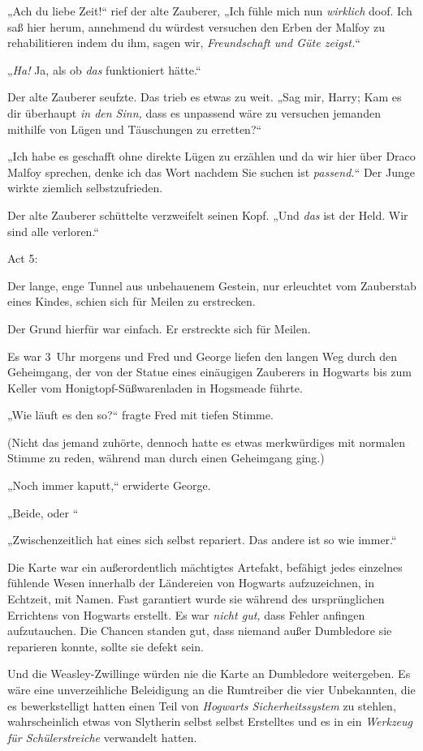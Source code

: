 {„Ach du liebe Zeit!“ rief der alte Zauberer, „Ich fühle mich nun \emph{wirklich} doof. Ich saß hier herum, annehmend du würdest versuchen den Erben der Malfoy zu rehabilitieren indem du ihm, sagen wir, \emph{Freundschaft und Güte zeigst.}“

„\emph{Ha!} Ja, als ob \emph{das} funktioniert hätte.“

Der alte Zauberer seufzte. Das trieb es etwas zu weit. „Sag mir, Harry; Kam es dir überhaupt \emph{in den Sinn,} dass es unpassend wäre zu versuchen jemanden mithilfe von Lügen und Täuschungen zu erretten?“

„Ich habe es geschafft ohne direkte Lügen zu erzählen und da wir hier über Draco Malfoy sprechen, denke ich das Wort nachdem Sie suchen ist \emph{passend.}“ Der Junge wirkte ziemlich selbstzufrieden.

Der alte Zauberer schüttelte verzweifelt seinen Kopf. „Und \emph{das} ist der Held. Wir sind alle verloren.“

Act 5:

Der lange, enge Tunnel aus unbehauenem Gestein, nur erleuchtet vom Zauberstab eines Kindes, schien sich für Meilen zu erstrecken.

Der Grund hierfür war einfach. Er erstreckte sich für Meilen.

Es war 3~Uhr morgens und Fred und George liefen den langen Weg durch den Geheimgang, der von der Statue eines einäugigen Zauberers in Hogwarts bis zum Keller vom Honigtopf-Süßwarenladen in Hogsmeade führte.

„Wie läuft es den so?“ fragte Fred mit tiefen Stimme.

(Nicht das jemand zuhörte, dennoch hatte es etwas merkwürdiges mit normalen Stimme zu reden, während man durch einen Geheimgang ging.)

„Noch immer kaputt,“ erwiderte George.

„Beide, oder \later“

„Zwischenzeitlich hat eines sich selbst repariert. Das andere ist so wie immer.“

Die Karte war ein außerordentlich mächtigtes Artefakt, befähigt jedes einzelnes fühlende Wesen innerhalb der Ländereien von Hogwarts aufzuzeichnen, in Echtzeit, mit Namen. Fast garantiert wurde sie während des ursprünglichen Errichtens von Hogwarts erstellt. Es war \emph{nicht gut,} dass Fehler anfingen aufzutauchen. Die Chancen standen gut, dass niemand außer Dumbledore sie reparieren konnte, sollte sie defekt sein.

Und die Weasley-Zwillinge würden nie die Karte an Dumbledore weitergeben. Es wäre eine unverzeihliche Beleidigung an die Rumtreiber \later die vier Unbekannten, die es bewerkstelligt hatten einen Teil von \emph{Hogwarts Sicherheitssystem} zu stehlen, wahrscheinlich etwas von Slytherin selbst selbst Erstelltes und es in ein \emph{Werkzeug für Schülerstreiche} verwandelt hatten.

}
